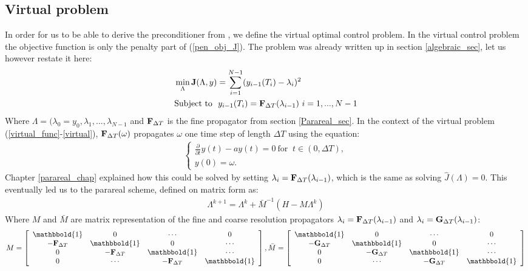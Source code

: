 \subsection{Virtual problem} \label{vir_sec}
In order for us to be able to derive the preconditioner from \cite{maday2002parareal}, we define the virtual optimal control problem. In the virtual control problem the objective function is only the penalty part of (\ref{pen_obj_J}). The problem was already written up in section \ref{algebraic_sec}, let us however restate it here:
\begin{align}
&\min_{\Lambda}\bold{J}(\Lambda,y) = \sum_{i=1}^{N-1} (y_{i-1}(T_{i})-\lambda_{i})^2 \label{virtual_func} \\
&\textrm{Subject to } \ y_{i-1}(T_{i}) = \bold F_{\Delta T}(\lambda_{i-1}) \ i=1,...,N-1 \label{virtual}
\end{align}
Where $\Lambda=(\lambda_0=y_0,\lambda_1,...,\lambda_ {N-1}$ and $\bold F_{\Delta T}$ is the fine propagator from section \ref{Parareal_sec}. In the context of the virtual problem (\ref{virtual_func}-\ref{virtual}), $\bold F_{\Delta T}(\omega)$ propagates $\omega$ one time step of length $\Delta T$ using the equation:
\begin{align}
\left\{
     \begin{array}{lr}
       	\frac{\partial}{\partial t} y(t)-ay(t)=0  \ \textrm{for } \ t\in(0,\Delta T),\\
       	y(0)=\omega.
     \end{array}
   \right. \label{virtual_exs}
\end{align} 
Chapter \ref{parareal_chap} explained how this could be solved by setting $\lambda_i= \bold F_{\Delta T}(\lambda_{i-1})$, which is the same as solving $\hat{J}(\Lambda)=0$. This eventually led us to the parareal scheme, defined on matrix form as:
\begin{align}
\Lambda^{k+1} = \Lambda^k + \bar{M}^{-1}(H-M\Lambda^k)\label{par_mat_sys}
\end{align}
Where $M$ and $\bar{M}$ are matrix representation of the fine and coarse resolution propagators $\lambda_i= \bold F_{\Delta T}(\lambda_{i-1})$ and  $\lambda_i= \bold G_{\Delta T}(\lambda_{i-1})$:
\begin{align*}
M = \left[ \begin{array}{cccc}
   \mathbbold{1} & 0 & \cdots & 0 \\  
   -\bold{F}_{\Delta T} & \mathbbold{1} & 0 & \cdots \\ 
   0 &-\bold{F}_{\Delta T} & \mathbbold{1}  & \cdots \\
   0 &\cdots &-\bold{F}_{\Delta T} & \mathbbold{1}  \\
   \end{array}  \right],
\bar{M} = \left[ \begin{array}{cccc}
   \mathbbold{1} & 0 & \cdots & 0 \\  
   -\bold{G}_{\Delta T} & \mathbbold{1} & 0 & \cdots \\ 
   0 &-\bold{G}_{\Delta T} & \mathbbold{1}  & \cdots \\
   0 &\cdots &-\bold{G}_{\Delta T} & \mathbbold{1}   \\
   \end{array}  \right]
\end{align*}
